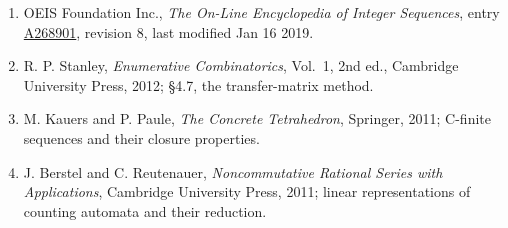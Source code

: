 \documentclass[11pt]{article}
\theoremstyle{definition}
\begin{document}
\begin{enumerate}

\item OEIS Foundation Inc., \emph{The On-Line Encyclopedia of Integer Sequences}, entry \href{https://oeis.org/A268901}{A268901}, revision 8, last modified Jan 16 2019.

\item R. P. Stanley, \emph{Enumerative Combinatorics}, Vol.~1, 2nd ed., Cambridge University Press, 2012; \S4.7, the transfer-matrix method.

\item M. Kauers and P. Paule, \emph{The Concrete Tetrahedron}, Springer, 2011; C-finite sequences and their closure properties.

\item J. Berstel and C. Reutenauer, \emph{Noncommutative Rational Series with Applications}, Cambridge University Press, 2011; linear representations of counting automata and their reduction.

\end{enumerate}
\end{document}
